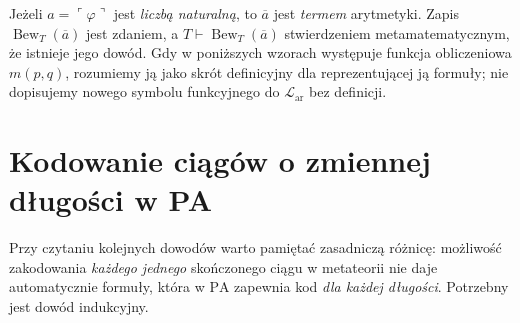 \begin{uwaga}
Jeżeli $a=\ulcorner\varphi\urcorner$ jest \emph{liczbą naturalną},
to $\overline a$ jest \emph{termem} arytmetyki. Zapis
$\operatorname{Bew}_T(\overline a)$ jest zdaniem, a
$T\vdash\operatorname{Bew}_T(\overline a)$ stwierdzeniem
metamatematycznym, że istnieje jego dowód. Gdy w poniższych
wzorach występuje funkcja obliczeniowa $m(p,q)$, rozumiemy ją
jako skrót definicyjny dla reprezentującej ją formuły;
nie dopisujemy nowego symbolu funkcyjnego do
$\mathcal L_{\mathrm{ar}}$ bez definicji.
\end{uwaga}

\section{Kodowanie ciągów o zmiennej długości w PA}
Przy czytaniu kolejnych dowodów warto pamiętać zasadniczą różnicę:
możliwość zakodowania \emph{każdego jednego} skończonego ciągu
w metateorii nie daje automatycznie formuły, która
w $\mathrm{PA}$ zapewnia kod \emph{dla każdej długości}.
Potrzebny jest dowód indukcyjny.

